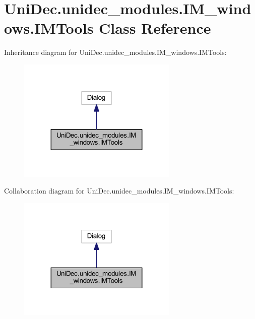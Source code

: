 \hypertarget{class_uni_dec_1_1unidec__modules_1_1_i_m__windows_1_1_i_m_tools}{}\section{Uni\+Dec.\+unidec\+\_\+modules.\+I\+M\+\_\+windows.\+I\+M\+Tools Class Reference}
\label{class_uni_dec_1_1unidec__modules_1_1_i_m__windows_1_1_i_m_tools}


Inheritance diagram for Uni\+Dec.\+unidec\+\_\+modules.\+I\+M\+\_\+windows.\+I\+M\+Tools\+:\nopagebreak
\begin{figure}[H]
\begin{center}
\leavevmode
\includegraphics[width=215pt]{class_uni_dec_1_1unidec__modules_1_1_i_m__windows_1_1_i_m_tools__inherit__graph}
\end{center}
\end{figure}


Collaboration diagram for Uni\+Dec.\+unidec\+\_\+modules.\+I\+M\+\_\+windows.\+I\+M\+Tools\+:\nopagebreak
\begin{figure}[H]
\begin{center}
\leavevmode
\includegraphics[width=215pt]{class_uni_dec_1_1unidec__modules_1_1_i_m__windows_1_1_i_m_tools__coll__graph}
\end{center}
\end{figure}
